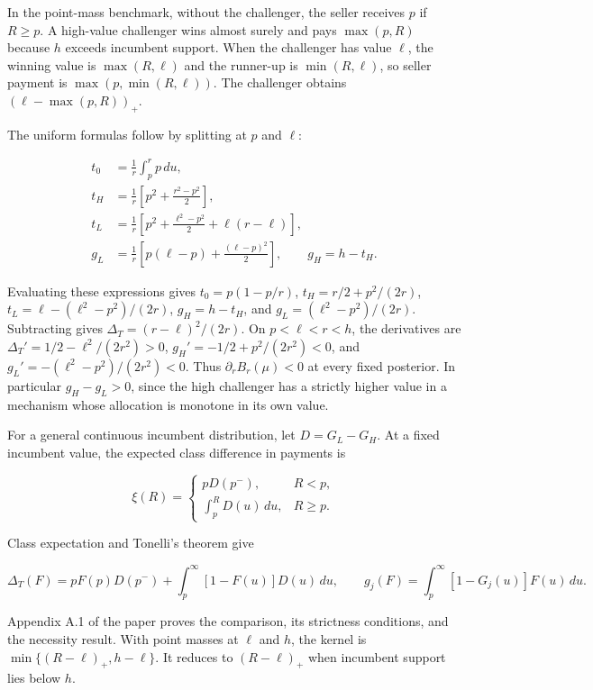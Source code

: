 \documentclass[
  11pt,
]{article}
\begin{document}
In the point-mass benchmark, without the challenger, the seller receives
\(p\) if \(R\ge p\). A high-value challenger wins almost surely and pays \(\max(p,R)\) because
\(h\) exceeds incumbent support. When the challenger has value \(\ell\),
the winning value is \(\max(R,\ell)\) and the runner-up is
\(\min(R,\ell)\), so seller payment is \(\max(p,\min(R,\ell))\). The
challenger obtains \((\ell-\max(p,R))_+\).

The uniform formulas follow by splitting at \(p\) and \(\ell\):

\[
\begin{aligned}
t_0&=\frac1r\int_p^r p\,du,\\
t_H&=\frac1r\left[p^2+\frac{r^2-p^2}{2}\right],\\
t_L&=\frac1r\left[p^2+\frac{\ell^2-p^2}{2}+\ell(r-\ell)\right],\\
g_L&=\frac1r\left[p(\ell-p)+\frac{(\ell-p)^2}{2}\right],\qquad g_H=h-t_H.
\end{aligned}
\tag{OA.5}\label{eq:oa-oa-5}
\]

Evaluating these expressions gives \(t_0=p(1-p/r)\),
\(t_H=r/2+p^2/(2r)\), \(t_L=\ell-(\ell^2-p^2)/(2r)\), \(g_H=h-t_H\), and
\(g_L=(\ell^2-p^2)/(2r)\). Subtracting gives
\(\Delta_T=(r-\ell)^2/(2r)\). On \(p<\ell<r<h\), the derivatives are
\(\Delta_T'=1/2-\ell^2/(2r^2)>0\), \(g_H'=-1/2+p^2/(2r^2)<0\), and
\(g_L'=-(\ell^2-p^2)/(2r^2)<0\). Thus \(\partial_rB_r(\mu)<0\) at every
fixed posterior. In particular \(g_H-g_L>0\), since the high challenger
has a strictly higher value in a mechanism whose allocation is monotone
in its own value.

For a general continuous incumbent distribution, let \(D=G_L-G_H\). At
a fixed incumbent value, the expected class difference in payments is

\[
\xi(R)=
\begin{cases}
pD(p^-),&R<p,\\
\int_p^RD(u)\,du,&R\ge p.
\end{cases}
\]

Class expectation and Tonelli's theorem give

\[
\Delta_T(F)=pF(p)D(p^-)+\int_p^\infty[1-F(u)]D(u)\,du,
\qquad
g_j(F)=\int_p^\infty[1-G_j(u)]F(u)\,du.
\tag{OA.6}\label{eq:oa-oa-6}
\]

Appendix A.1 of the paper proves the comparison, its strictness
conditions, and the necessity result. With point masses at \(\ell\) and
\(h\), the kernel is \(\min\{(R-\ell)_+,h-\ell\}\). It reduces to
\((R-\ell)_+\) when incumbent support lies below \(h\).
\end{document}
